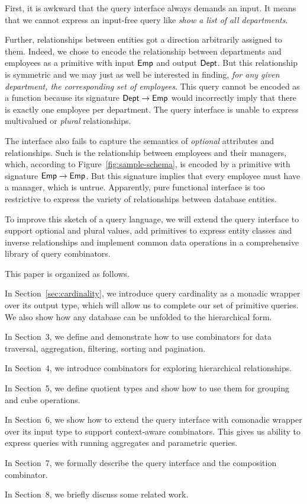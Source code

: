 First, it is awkward that the query interface always demands an input.  It
means that we cannot express an input-free query like \emph{show a list of all
departments}.

Further, relationships between entities got a direction arbitrarily assigned to
them.  Indeed, we chose to encode the relationship between departments and
employees as a primitive with input $\textup{\textsf{Emp}}$ and output $\textup{\textsf{Dept}}$.  But this
relationship is symmetric and we may just as well be interested in finding,
\emph{for any given department, the corresponding set of employees}.  This
query cannot be encoded as a function because its signature $\textup{\textsf{Dept}} \to \textup{\textsf{Emp}}$
would incorrectly imply that there is exactly one employee per department.  The
query interface is unable to express multivalued or \emph{plural}
relationships.

The interface also fails to capture the semantics of \emph{optional} attributes
and relationships.  Such is the relationship between employees and their
managers, which, according to Figure~\ref{fig:sample-schema}, is encoded by
a primitive with signature $\textup{\textsf{Emp}} \to \textup{\textsf{Emp}}$.
But this signature implies that every employee must have a manager, which is
untrue.  Apparently, pure functional interface is too restrictive to express
the variety of relationships between database entities.

To improve this sketch of a query language, we will extend the query interface
to support optional and plural values, add primitives to express entity classes
and inverse relationships and implement common data operations in a
comprehensive library of query combinators.

This paper is organized as follows.

In Section~\ref{sec:cardinality}, we introduce query cardinality as a mo\-nadic
wrapper over its output type, which will allow us to complete our set of
primitive queries.  We also show how any database can be unfolded to the
hierarchical form.

In Section~3, we define and demonstrate how to use combinators for data
traversal, aggregation, filtering, sorting and pagination.

In Section~4, we introduce combinators for exploring hierarchical
relationships.

In Section~5, we define quotient types and show how to use them for grouping
and cube operations.

In Section~6, we show how to extend the query interface with comonadic wrapper
over its input type to support context-aware combinators.  This gives us
ability to express queries with running aggregates and parametric queries.

In Section~7, we formally describe the query interface and the composition
combinator.

In Section~8, we briefly discuss some related work.

